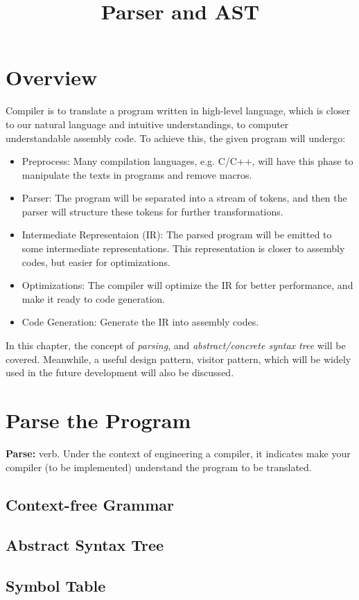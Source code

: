 \documentclass{article}
\title{Parser and AST}
\date{}
\begin{document}
\maketitle

\section{Overview}

Compiler is to translate a program written in high-level language,
which is closer to our natural language and intuitive understandings,
to computer understandable assembly code. To achieve this, the
given program will undergo:

\begin{itemize}
  \item Preprocess: Many compilation languages, e.g. C/C++,
    will have this phase to manipulate the texts in programs and remove macros.
  \item Parser: The program will be separated into a stream of tokens, and then
    the parser will structure these tokens for further transformations.
  \item Intermediate Representaion (IR): The parsed program will be emitted to some
    intermediate representations. This representation is closer to assembly codes,
    but easier for optimizations.
  \item Optimizations: The compiler will optimize the IR for better performance, and
    make it ready to code generation.
  \item Code Generation: Generate the IR into assembly codes.
\end{itemize}

In this chapter, the concept of \emph{parsing},
and \emph{abstract/concrete syntax tree} will be covered.
Meanwhile, a useful design pattern, visitor pattern,
which will be widely used in the future development
will also be discussed.

\section{Parse the Program}

\textbf{Parse:} verb. Under the context of engineering a compiler,
it indicates make your compiler (to be implemented) understand the
program to be translated.

\subsection{Context-free Grammar}

\subsection{Abstract Syntax Tree}

\subsection{Symbol Table}
\end{document}
